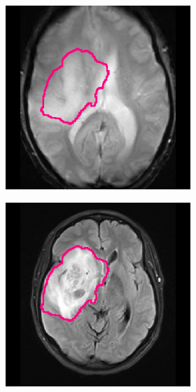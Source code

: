 \begin{subappendices}
\begin{figure}[htbp]
\begin{subfigure}[b]{0.95\textwidth}
\begin{subfigure}[b]{0.215\textwidth}
        \end{subfigure}
        \hfill
        \begin{subfigure}[b]{0.215\textwidth}
        \includegraphics[width=\textwidth, clip, trim=2.5cm 0.5cm 2.5cm 0.5cm]{Figures/Random_segs/T2_TCGA-14-3477.png}
        \end{subfigure}
        \hfill
        \begin{subfigure}[b]{0.215\textwidth}
        \includegraphics[width=\textwidth, clip, trim=2.5cm 0.5cm 2.5cm 0.5cm]{Figures/Random_segs/FLAIR_TCGA-14-3477.png}

\end{subfigure}
\end{subfigure}
\end{figure}
\end{subappendices}
